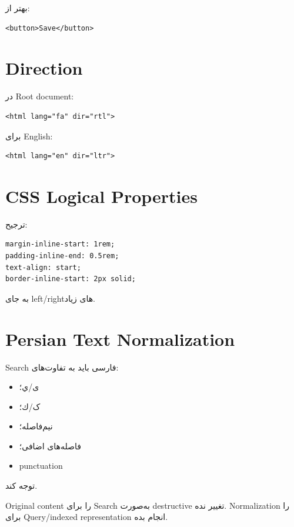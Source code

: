 بهتر از:
\begin{latin}
\begin{lstlisting}
<button>Save</button>
\end{lstlisting}
\end{latin}

\section{Direction}

در Root document:
\begin{latin}
\begin{lstlisting}
<html lang="fa" dir="rtl">
\end{lstlisting}
\end{latin}

برای English:
\begin{latin}
\begin{lstlisting}
<html lang="en" dir="ltr">
\end{lstlisting}
\end{latin}

\section{CSS Logical Properties}

ترجیح:
\begin{latin}
\begin{lstlisting}
margin-inline-start: 1rem;
padding-inline-end: 0.5rem;
text-align: start;
border-inline-start: 2px solid;
\end{lstlisting}
\end{latin}

به جای left/rightهای زیاد.

\section{Persian Text Normalization}

Search فارسی باید به تفاوت‌های:
\begin{itemize}
  \item ی/ي؛
  \item ک/ك؛
  \item نیم‌فاصله؛
  \item فاصله‌های اضافی؛
  \item punctuation
\end{itemize}
توجه کند.

\begin{warningbox}
Original content را برای Search به‌صورت destructive تغییر نده. Normalization را برای Query/indexed representation انجام بده.
\end{warningbox}

